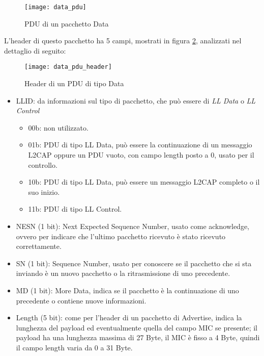 \begin{figure}[H]
\texttt{[image: data\_pdu]}
\centering
\caption{PDU di un pacchetto Data}
\label{data_pdu}
\end{figure}

L'header di questo pacchetto ha 5 campi, mostrati in figura \ref{data_pdu_header}, analizzati nel dettaglio di seguito:

\begin{figure}[H]
\texttt{[image: data\_pdu\_header]}
\centering
\caption{Header di un PDU di tipo Data}
\label{data_pdu_header}
\end{figure}

\begin{samepage}

\begin{itemize}

\item LLID: da informazioni sul tipo di pacchetto, che può essere di \emph{LL Data} o \emph{LL Control}

\begin{itemize}
\item 00b: non utilizzato.
\item 01b: PDU di tipo LL Data, può essere la continuazione di un messaggio L2CAP oppure un PDU vuoto, con campo length posto a 0, usato per il controllo.
\item 10b: PDU di tipo LL Data, può essere un messaggio L2CAP completo o il suo inizio.
\item 11b: PDU di tipo LL Control.
\end{itemize}

\item NESN (1 bit): Next Expected Sequence Number, usato come acknowledge, ovvero per indicare che l'ultimo pacchetto ricevuto è stato ricevuto correttamente.
\item SN (1 bit): Sequence Number, usato per conoscere se il pacchetto che si sta inviando è un nuovo pacchetto o la ritrasmissione di uno precedente.
\item MD (1 bit): More Data, indica se il pacchetto è la continuazione di uno precedente o  contiene nuove informazioni.
\item Length (5 bit): come per l'header di un pacchetto di Advertise, indica la lunghezza del payload ed eventualmente quella del campo MIC se presente; il payload ha una lunghezza massima di 27 Byte, il MIC è fisso a 4 Byte, quindi il campo length varia da 0 a 31 Byte.

\end{itemize}
\end{samepage}

